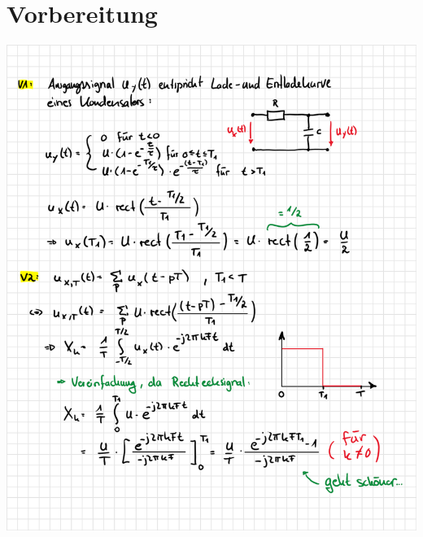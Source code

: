 \chapter{Vorbereitung}
\thispagestyle{fancy}

\begin{center}
	\includegraphics[]{img/ssp1_vorb1.png}
	\newpage
	\thispagestyle{fancy}

\end{center}

